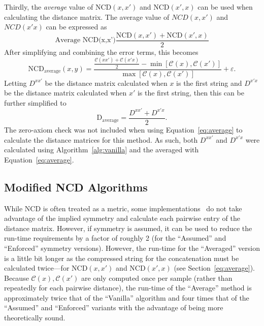 \documentclass[preprint,12pt]{elsarticle}
\begin{document}
Thirdly, the \textit{average} value of $\text{NCD}(x,x')$ and $\text{NCD}(x',x)$ can be used when calculating the distance matrix.
The average value of $NCD(x,x')$ and $NCD(x'x)$ can be expressed as
$$
\text{Average~NCD(x,x')}\frac{\text{NCD}(x,x') + \text{NCD}(x', x)}{2}
$$
After simplifying and combining the error terms, this becomes
\begin{equation}
    \text{NCD}_{\text{average}}(x, y) = \frac{\frac{\mathcal{C}(xx') + \mathcal{C}(x'x)}{2} - \min[\mathcal{C}(x), \mathcal{C}(x')]}{\max[\mathcal{C}(x), \mathcal{C}(x')]} + \varepsilon.
\end{equation}
Letting $D^{xx'}$ be the distance matrix calculated when $x$ is the first string and $D^{x'x}$ be the distance matrix calculated when $x'$ is the first string, then this can be further simplified to
\begin{equation}
    \text{D}_{\text{average}} = \frac{D^{xx'}  + D^{x'x}}{2}.
    \label{eq:average}
\end{equation}
The zero-axiom check was not included when using Equation~\ref{eq:average} to calculate the distance matrices for this method.
As such, both $D^{xx'}$ and $D^{x'x}$ were calculated using Algorithm~\ref{alg:vanilla} and the averaged with Equation~\ref{eq:average}.

\subsection{Modified NCD Algorithms}

While NCD is often treated as a metric, some implementations~\cite{jiang2022less} do not take advantage of the implied symmetry and calculate each pairwise entry of the distance matrix.
However, if symmetry is assumed, it can be used to reduce the run-time requirements by a factor of roughly 2 (for the ``Assumed'' and ``Enforced'' symmetry versions).
However, the run-time for the ``Averaged'' version is a little bit longer as the compressed string for the concatenation must be calculated twice---for $\text{NCD}(x,x')$ and $\text{NCD}(x',x)$ (see Section~\ref{eq:average}).
Because $\mathcal{C}(x), \mathcal{C}(x')$ are only computed once per sample (rather than repeatedly for each pairwise distance), the run-time of the ``Average'' method is approximately twice that of the ``Vanilla'' algorithm and four times that of the ``Assumed'' and ``Enforced'' variants with the advantage of being more theoretically sound.
\end{document}
